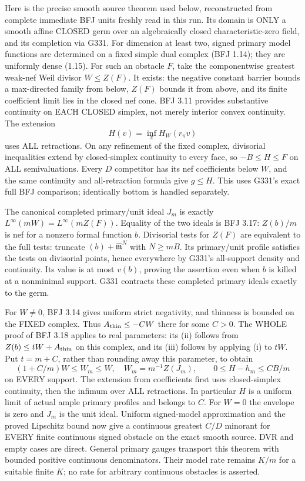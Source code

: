 \documentclass[11pt]{article}
\begin{document}
Here is the precise smooth source theorem used below, reconstructed from
complete immediate BFJ units freshly read in this run. Its domain is ONLY
a smooth affine CLOSED germ over an algebraically closed characteristic-zero
field, and its completion via G331. For dimension at least two, signed
primary model functions are determined on a fixed simple dual complex
(BFJ 1.14); they are uniformly dense (1.15). For such an obstacle $F$,
take the componentwise greatest weak-nef Weil divisor $W\le Z(F)$.
It exists: the negative constant barrier bounds a max-directed family from
below, $Z(F)$ bounds it from above, and its finite coefficient limit lies
in the closed nef cone. BFJ 3.11 provides substantive continuity on EACH
CLOSED simplex, not merely interior convex continuity. The extension
\[
 H(v)=\inf_{\pi} H_W(r_\pi v)
\]
uses ALL retractions. On any refinement of the fixed complex, divisorial
inequalities extend by closed-simplex continuity to every face, so
$-B\le H\le F$ on ALL semivaluations. Every $D$ competitor has its
nef coefficients below $W$, and the same continuity and all-retraction
formula give $g\le H$. This uses G331's exact full BFJ comparison;
identically bottom is handled separately.

The canonical completed primary/unit ideal $J_m$ is exactly
$L^\infty(mW)=L^\infty(mZ(F))$. Equality of the two ideals is BFJ 3.17:
$Z(b)/m$ is nef for a nonzero formal function $b$. Divisorial tests for
$Z(F)$ are equivalent to the full tests: truncate $(b)+\widehat{\mathfrak
m}^{N}$ with $N\ge mB$. Its primary/unit profile satisfies the tests on
divisorial points, hence everywhere by G331's all-support density and
continuity. Its value is at most $v(b)$, proving the assertion even when
$b$ is killed at a nonminimal support. G331 contracts these completed
primary ideals exactly to the germ.

For $W\ne0$, BFJ 3.14 gives uniform strict negativity, and thinness is
bounded on the FIXED complex. Thus $A_{\rm thin}\le-CW$ there for some
$C>0$. The WHOLE proof of BFJ 3.18 applies to real parameters: its (ii)
follows from $Z(b)\le tW+A_{\rm thin}$ on this complex, and its (iii)
follows by applying (i) to $tW$. Put $t=m+C$, rather than rounding away
this parameter, to obtain
\[
 (1+C/m)W\le W_m\le W,\quad W_m=m^{-1}Z(J_m),
 \qquad 0\le H-h_m\le CB/m
\]
on EVERY support. The extension from coefficients first uses closed-simplex
continuity, then the infimum over ALL retractions. In particular $H$ is a
uniform limit of actual ample primary profiles and belongs to $C$.
For $W=0$ the envelope is zero and $J_m$ is the unit ideal. Uniform
signed-model approximation and the proved Lipschitz bound now give a
continuous greatest $C/D$ minorant for EVERY finite continuous signed
obstacle on the exact smooth source. DVR and empty cases are direct.
General primary gauges transport this theorem with bounded positive
continuous denominators. Their model rate remains $K/m$ for a suitable
finite $K$; no rate for arbitrary continuous obstacles is asserted.
\end{document}
